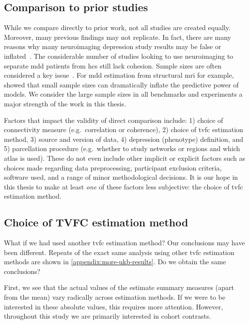 \subsection{Comparison to prior studies}

While we compare directly to prior work, not all studies are created equally.
Moreover, many previous findings may not replicate.
In fact, there are many reasons why many neuroimaging depression study results may be false or inflated~\parencite{Flint2021}.
The considerable number of studies looking to use neuroimaging to separate \gls{mdd} patients from \glspl{hc} still lack cohesion.
Sample sizes are often considered a key issue~\parencite{Varoquaux2018, Szucs2020, Libedinsky2022, Marek2022}.
For \gls{mdd} estimation from structural \gls{mri} for example, \textcite{Flint2021} showed that small sample sizes can dramatically inflate the predictive power of models.
We consider the large sample sizes in all benchmarks and experiments a major strength of the work in this thesis.

Factors that impact the validity of direct comparison include: 1) choice of connectivity measure (e.g.~correlation or coherence), 2) choice of \gls{tvfc} estimation method, 3) source and version of data, 4) depression (phenotype) definition, and 5) parcellation procedure (e.g.~whether to study networks or regions and which atlas is used).
These do not even include other implicit or explicit factors such as choices made regarding data preprocessing, participant exclusion criteria, software used, and a range of minor methodological decisions.
It is our hope in this thesis to make at least \emph{one} of these factors less subjective: the choice of \gls{tvfc} estimation method.

\subsection{Choice of TVFC estimation method}

What if we had used another \gls{tvfc} estimation method?
Our conclusions may have been different.
Repeats of the exact same analysis using other \gls{tvfc} estimation methods are shown in \cref{appendix:more-ukb-results}.
Do we obtain the same conclusions?

First, we see that the actual values of the estimate summary measures (apart from the mean) vary radically across estimation methods.
If we were to be interested in these absolute values, this requires more attention.
However, throughout this study we are primarily interested in cohort contrasts.

